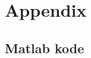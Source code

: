 \documentclass[../main/main.tex]{subfiles}
\begin{document}
\newpage
\appendix
\section{Appendix}

\subsection{Matlab kode}
\label{sec:appendix_matlab}



\printbibliography{}
\end{document}
